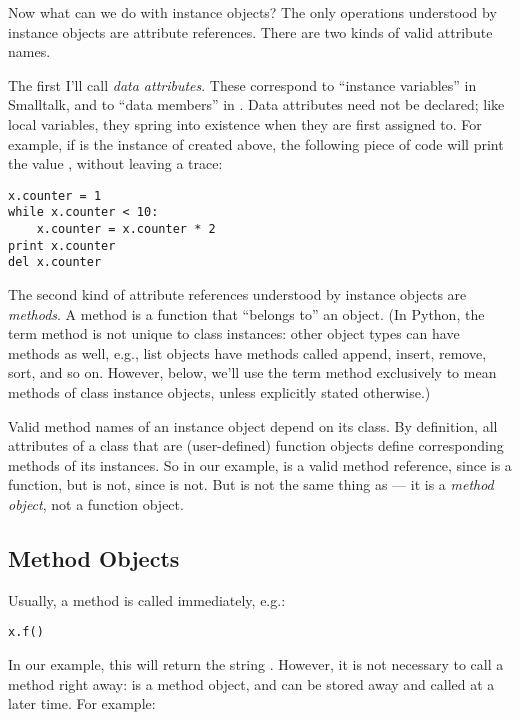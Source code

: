 \documentclass{manual}
\begin{document}
Now what can we do with instance objects?  The only operations
understood by instance objects are attribute references.  There are
two kinds of valid attribute names.

The first I'll call \emph{data attributes}.  These correspond to
``instance variables'' in Smalltalk, and to ``data members'' in
\Cpp{}.  Data attributes need not be declared; like local variables,
they spring into existence when they are first assigned to.  For
example, if  is the instance of  created above,
the following piece of code will print the value , without
leaving a trace:

\begin{verbatim}
x.counter = 1
while x.counter < 10:
    x.counter = x.counter * 2
print x.counter
del x.counter
\end{verbatim}

The second kind of attribute references understood by instance objects
are \emph{methods}.  A method is a function that ``belongs to'' an
object.  (In Python, the term method is not unique to class instances:
other object types can have methods as well, e.g., list objects have
methods called append, insert, remove, sort, and so on.  However,
below, we'll use the term method exclusively to mean methods of class
instance objects, unless explicitly stated otherwise.)

Valid method names of an instance object depend on its class.  By
definition, all attributes of a class that are (user-defined) function 
objects define corresponding methods of its instances.  So in our
example,  is a valid method reference, since
 is a function, but  is not, since
 is not.  But  is not the same thing as
 --- it is a \emph{method object}, not
a function object.


\subsection{Method Objects \label{methodObjects}}

Usually, a method is called immediately, e.g.:

\begin{verbatim}
x.f()
\end{verbatim}

In our example, this will return the string .
However, it is not necessary to call a method right away:
 is a method object, and can be stored away and called at a
later time.  For example:
\end{document}
